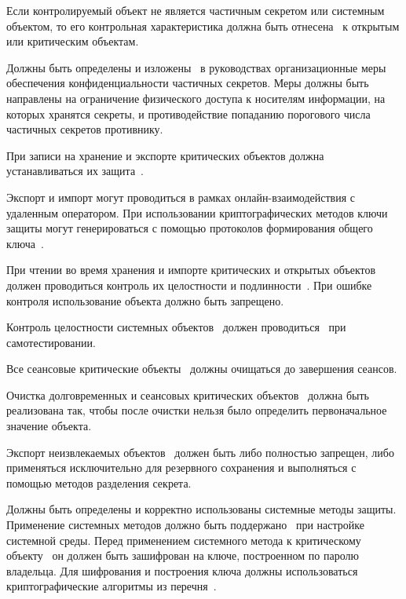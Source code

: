 Если контролируемый объект не является частичным секретом или системным
объектом, то его контрольная характеристика должна быть 
отнесена~ к открытым или критическим объектам.

\label{R.DP.Org} %
Должны быть определены и изложены~ 
в руководствах организационные меры обеспечения конфиденциальности 
частичных секретов. Меры должны быть направлены на ограничение физического 
доступа к носителям информации, на которых хранятся секреты, и 
противодействие попаданию порогового числа частичных секретов 
противнику. 

\label{R.DP.Export} %
При записи на хранение и экспорте критических объектов должна 
устанавливаться их защита~.

\begin{note*}
Экспорт и импорт могут проводиться в рамках онлайн-взаимодействия с 
удаленным оператором. При использовании криптографических методов ключи защиты  
могут генерироваться с помощью протоколов формирования общего 
ключа~.
\end{note*}

\label{R.DP.Import} %
При чтении во время хранения и импорте критических и открытых объектов  
должен проводиться контроль их целостности и подлинности~. 
При ошибке контроля использование объекта должно быть запрещено. 

\label{R.DP.System} %
Контроль целостности системных объектов~ 
должен проводиться~ при самотестировании.

\label{R.DP.Session} %
Все сеансовые критические объекты~
должны очищаться до завершения сеансов.

\label{R.DP.Zero} %
Очистка долговременных и сеансовых критических объектов~ 
должна быть реализована так, чтобы после очистки нельзя было определить 
первоначальное значение объекта. 

\label{R.DP.NonExtr} %
Экспорт неизвлекаемых объектов~ должен быть либо полностью 
запрещен, либо применяться исключительно для резервного сохранения 
и выполняться с помощью методов разделения секрета. 

\label{R.DP.Sys} %
Должны быть определены и корректно использованы системные методы защиты.
Применение системных методов должно быть поддержано~
при настройке системной среды.
%
Перед применением системного метода к критическому объекту~ 
он должен быть зашифрован на ключе, построенном по паролю владельца. 
%
Для шифрования и построения ключа должны использоваться 
криптографические алгоритмы из перечня~.

